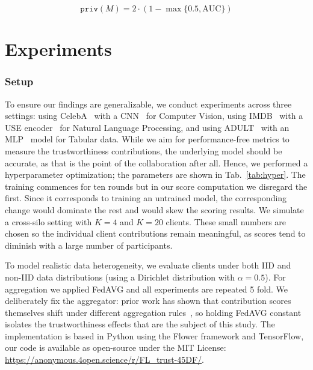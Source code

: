 \documentclass[acmsmall]{acmart}
\begin{document}
\begin{equation}
    \label{eq:priv}
    \mathtt{priv}(M) = 2 \cdot (1 - \max\{0.5,\text{AUC}\})
\end{equation}

\section{Experiments}
\label{sec:exp}

\subsubsection*{Setup}

To ensure our findings are generalizable, we conduct experiments across three settings: using CelebA~\cite{liu2015faceattributes} with a CNN~\cite{krizhevsky2012imagenet} for Computer Vision, using IMDB~\cite{maas-EtAl:2011:ACL-HLT2011} with a USE encoder~\cite{use} for Natural Language Processing, and using ADULT~\cite{becker1996adult} with an MLP~\cite{rumelhart1985learning} model for Tabular data. While we aim for performance-free metrics to measure the trustworthiness contributions, the underlying model should be accurate, as that is the point of the collaboration after all. Hence, we performed a hyperparameter optimization; the parameters are shown in Tab.~\ref{tab:hyper}. The training commences for ten rounds but in our score computation we disregard the first. Since it corresponds to training an untrained model, the corresponding change would dominate the rest and would skew the scoring results. We simulate a cross-silo setting with $K=4$ and $K=20$ clients. These small numbers are chosen so the individual client contributions remain meaningful, as scores tend to diminish with a large number of participants. 

To model realistic data heterogeneity, we evaluate clients under both IID and non-IID data distributions (using a Dirichlet distribution with $\alpha=0.5$). For aggregation we applied FedAVG and all experiments are repeated 5 fold. We deliberately fix the aggregator: prior work has shown that contribution scores themselves shift under different aggregation rules~\cite{pejo2025fragility}, so holding FedAVG constant isolates the trustworthiness effects that are the subject of this study. The implementation is based in Python using the Flower framework and TensorFlow, our code is available as open-source under the MIT License: \url{https://anonymous.4open.science/r/FL_trust-45DF/}.
\end{document}
